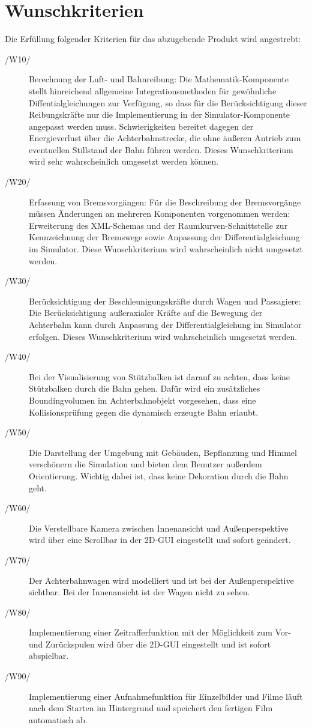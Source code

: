 \section{Wunschkriterien}
Die Erfüllung folgender Kriterien für das abzugebende Produkt wird angestrebt:

\begin{description}
	\item[/W10/] Berechnung der Luft- und Bahnreibung: Die Mathematik-Komponente stellt hinreichend allgemeine Integrationsmethoden für gewöhnliche Diffentialgleichungen zur Verfügung, so dass
		     für die Berücksichtigung dieser Reibungskräfte nur die Implementierung in der Simulator-Komponente angepasst werden muss. Schwierigkeiten bereitet dagegen der Energieverlust über
		     die Achterbahnstrecke, die ohne äußeren Antrieb zum eventuellen Stillstand der Bahn führen werden. Dieses Wunschkriterium wird sehr wahrscheinlich umgesetzt werden können.
	\item[/W20/] Erfassung von Bremsvorgängen: Für die Beschreibung der Bremsvorgänge müssen Änderungen an mehreren Komponenten vorgenommen werden: Erweiterung des XML-Schemas und
		     der Raumkurven-Schnittstelle zur Kennzeichnung der Bremswege sowie Anpassung der Differentialgleichung im Simulator. Diese Wunschkriterium wird wahrscheinlich nicht umgesetzt werden.
	\item[/W30/] Berücksichtigung der Beschleunigungskräfte durch Wagen und Passagiere: Die Berücksichtigung außeraxialer Kräfte auf die Bewegung der Achterbahn kann durch Anpassung der
                     Differentialgleichung im Simulator erfolgen. Dieses Wunschkriterium wird wahrscheinlich umgesetzt werden.
	\item[/W40/] Bei der Visualisierung von Stützbalken ist darauf zu achten, dass keine Stützbalken durch die Bahn gehen. Dafür wird ein zusätzliches Boundingvolumen im Achterbahnobjekt vorgesehen, dass eine Kollisionsprüfung gegen die dynamisch erzeugte Bahn erlaubt.
	\item[/W50/] Die Darstellung der Umgebung mit Gebäuden, Bepflanzung und Himmel verschönern die Simulation und bieten dem Benutzer außerdem Orientierung. Wichtig dabei ist, dass keine Dekoration durch die Bahn geht.
	\item[/W60/] Die Verstellbare Kamera zwischen Innenansicht und Außenperspektive wird über eine Scrollbar in der 2D-GUI eingestellt und sofort geändert.
	\item[/W70/] Der Achterbahnwagen wird modelliert und ist bei der Außenperspektive sichtbar. Bei der Innenansicht ist der Wagen nicht zu sehen.
	\item[/W80/] Implementierung einer Zeitrafferfunktion mit der Möglichkeit zum Vor- und Zurückspulen wird über die 2D-GUI eingestellt und ist sofort abspielbar.
	\item[/W90/] Implementierung einer Aufnahmefunktion für Einzelbilder und Filme läuft nach dem Starten im Hintergrund und speichert den fertigen Film automatisch ab.
\end{description}

